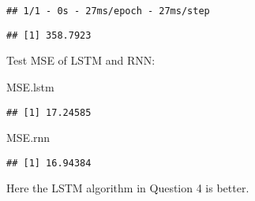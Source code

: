 \documentclass[
]{article}
\newenvironment{Shaded}{\begin{snugshade}}{\end{snugshade}}
\newcommand{\AttributeTok}[1]{\textcolor[rgb]{0.77,0.63,0.00}{#1}}
\newcommand{\DecValTok}[1]{\textcolor[rgb]{0.00,0.00,0.81}{#1}}
\newcommand{\NormalTok}[1]{#1}
\newcommand{\SpecialCharTok}[1]{\textcolor[rgb]{0.00,0.00,0.00}{#1}}
\begin{document}
\begin{verbatim}
## 1/1 - 0s - 27ms/epoch - 27ms/step
\end{verbatim}

\begin{Shaded}
\end{Shaded}

\begin{verbatim}
## [1] 358.7923
\end{verbatim}

Test MSE of LSTM and RNN:

\begin{Shaded}
\begin{Highlighting}[]
\NormalTok{MSE.lstm}
\end{Highlighting}
\end{Shaded}

\begin{verbatim}
## [1] 17.24585
\end{verbatim}

\begin{Shaded}
\begin{Highlighting}[]
\NormalTok{MSE.rnn}
\end{Highlighting}
\end{Shaded}

\begin{verbatim}
## [1] 16.94384
\end{verbatim}

Here the LSTM algorithm in Question 4 is better.
\end{document}
